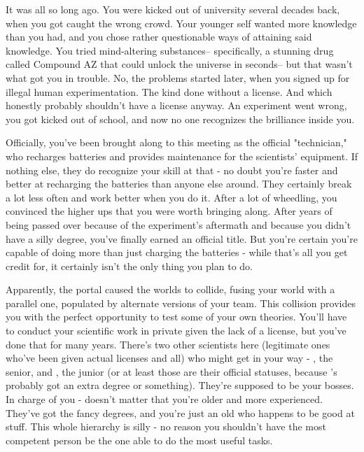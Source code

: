 \documentclass[char]{guildcamp3}
\begin{document}
\name{\cTech{}}

It was all so long ago. You were kicked out of university several decades back, when you got caught the wrong crowd. Your younger self wanted more knowledge than you had, and you chose rather questionable ways of attaining said knowledge. You tried mind-altering substances-- specifically, a stunning drug called Compound AZ that could unlock the universe in seconds-- but that wasn't what got you in trouble. No, the problems started later, when you signed up for illegal human experimentation. The kind done without a license. And which honestly probably shouldn't have a license anyway. An experiment went wrong, you got kicked out of school, and now no one recognizes the brilliance inside you.

Officially, you've been brought along to this meeting as the official "technician," who recharges batteries and provides maintenance for the scientists' equipment. If nothing else, they do recognize your skill at that - no doubt you're faster and better at recharging the batteries than anyone else around. They certainly break a lot less often and work better when you do it. After a lot of wheedling, you convinced the higher ups that you were worth bringing along. After years of being passed over because of the experiment's aftermath and because you didn't have a silly degree, you've finally earned an official title. But you're certain you're capable of doing more than just charging the batteries - while that's all you get credit for, it certainly isn't the only thing you plan to do. 

Apparently, the portal caused the worlds to collide, fusing your world with a parallel one, populated by alternate versions of your team. This collision provides you with the perfect opportunity to test some of your own theories. You'll have to conduct your scientific work in private given the lack of a license, but you've done that for many years. There's two other scientists here (legitimate ones who've been given actual licenses and all) who might get in your way - \cSciOne{\intro}, the senior, and \cSciTwo{\intro}, the junior (or at least those are their official statuses, because \cSciOne{}'s probably got an extra degree or something). They're supposed to be your bosses. In charge of you - doesn't matter that you're older and more experienced. They've got the fancy degrees, and you're just an old \cTech{\human} who happens to be good at stuff. This whole hierarchy is silly - no reason you shouldn't have the most competent person be the one able to do the most useful tasks. 
\end{document}
